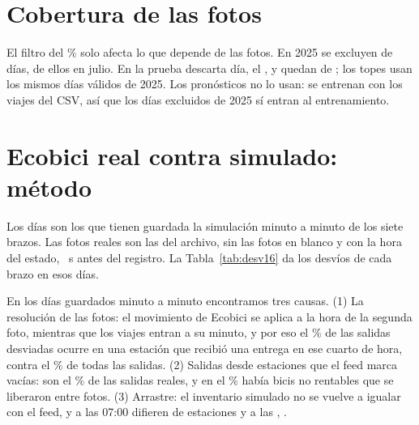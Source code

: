\documentclass[conference,letterpaper,10pt]{IEEEtran}
\begin{document}
\begin{table}[H]
\centering\footnotesize
\setlength{\tabcolsep}{4pt}
\caption{Efecto de quitar pares que se deshacen. Media por día.}
\label{tab:pares}

\end{table}



\section{Cobertura de las fotos}\label{ap:cobertura}
El filtro del \rcovMin\% solo afecta lo que depende de las fotos. En 2025 se excluyen \cvExcVeinticinco{} de \cvDiasVeinticinco{} días, \cvExcJul{} de ellos en julio. En la prueba descarta \cvDifPrueba{} día, el \cvDiaExcl, y quedan \cvOkPrueba{} de \cvDiasPrueba; los topes usan los mismos \cvOkVeinticinco{} días válidos de 2025. Los pronósticos no lo usan: se entrenan con los viajes del CSV, así que los \cvExcVeinticinco{} días excluidos de 2025 sí entran al entrenamiento.

\section{Ecobici real contra simulado: método}\label{ap:fidelidad}
Los \rcfDias{} días son los que tienen guardada la simulación minuto a minuto de los siete brazos. Las fotos reales son las del archivo, sin las fotos en blanco y con la hora del estado, \rlagS~s antes del registro. La Tabla~\ref{tab:desv16} da los desvíos de cada brazo en esos días.

\begin{table}[H]
\centering\footnotesize
\caption{Desvíos por brazo en los \rcfDias{} días. \%: desvíos por cada 100 salidas.}
\label{tab:desv16}

\end{table}

En los \rcfDias{} días guardados minuto a minuto encontramos tres causas. (1) La resolución de las fotos: el movimiento de Ecobici se aplica a la hora de la segunda foto, mientras que los viajes entran a su minuto, y por eso el \rcUnoSal\% de las salidas desviadas ocurre en una estación que recibió una entrega en ese cuarto de hora, contra el \rcUnoTSal\% de todas las salidas. (2) Salidas desde estaciones que el feed marca vacías: son el \rcDosPct\% de las salidas reales, y en el \rcDosNR\% había bicis no rentables que se liberaron entre fotos. (3) Arrastre: el inventario simulado no se vuelve a igualar con el feed, y a las 07:00 difieren \rcTresSiete{} de \rcTresEst{} estaciones y a las \rcTresPicoHora, \rcTresPico.
\end{document}
